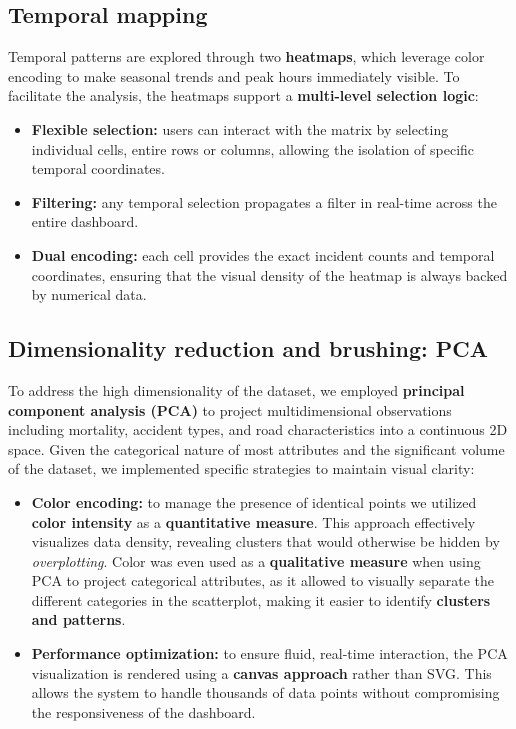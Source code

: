 \documentclass[12pt]{article}
\begin{document}
\subsection{Temporal mapping}
Temporal patterns are explored through two \textbf{heatmaps}, which leverage color encoding to make seasonal trends and peak hours immediately visible. To facilitate the analysis, the heatmaps support a \textbf{multi-level selection logic}:

\begin{itemize}
    \item \textbf{Flexible selection:} users can interact with the matrix by selecting individual cells, entire rows or columns, allowing the isolation of specific temporal coordinates.
    
    \item \textbf{Filtering:} any temporal selection propagates a filter in real-time across the entire dashboard.
    
    \item \textbf{Dual encoding:} each cell provides the exact incident counts and temporal coordinates, ensuring that the visual density of the heatmap is always backed by numerical data.
\end{itemize}

\subsection{Dimensionality reduction and brushing: PCA}
To address the high dimensionality of the dataset, we employed \textbf{principal component analysis (PCA)} to project multidimensional observations including mortality, accident types, and road characteristics into a continuous 2D space. 
Given the categorical nature of most attributes and the significant volume of the dataset, we implemented specific strategies to maintain visual clarity:
\begin{itemize}
    \item \textbf{Color encoding:} to manage the presence of identical points we utilized \textbf{color intensity} as a \textbf{quantitative measure}. This approach effectively visualizes data density, revealing clusters that would otherwise be hidden by \textit{overplotting}. Color was even used as a \textbf{qualitative measure} when using PCA to project categorical attributes, as it allowed to visually separate the different categories in the scatterplot, making it easier to identify \textbf{clusters and patterns}.
    
    \item \textbf{Performance optimization:} to ensure fluid, real-time interaction, the PCA visualization is rendered using a \textbf{canvas approach} rather than SVG. This allows the system to handle thousands of data points without compromising the responsiveness of the dashboard.
\end{itemize}
\end{document}
